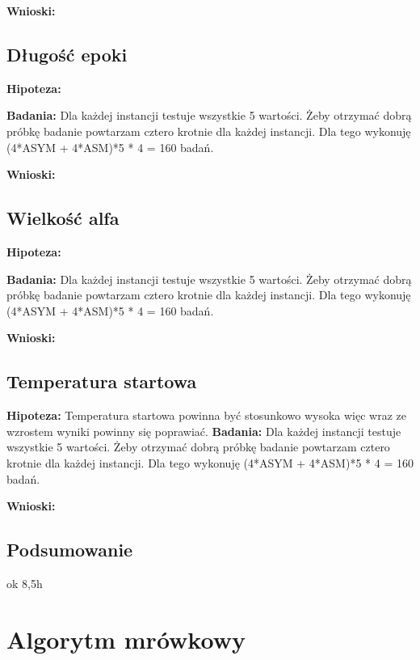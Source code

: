 \documentclass{article}
\begin{document}
        \textbf{Wnioski: } 
      \subsection{Długość epoki}

        \textbf{Hipoteza: }

        \textbf{Badania: } Dla każdej instancji testuje wszystkie 5 wartości. 
        Żeby otrzymać dobrą próbkę badanie powtarzam cztero krotnie dla każdej 
        instancji. Dla tego wykonuję (4*ASYM + 4*ASM)*5 * 4 = 160 badań.\linebreak 

        \textbf{Wnioski: } 
      \subsection{Wielkość alfa}

        \textbf{Hipoteza: }

        \textbf{Badania: } Dla każdej instancji testuje wszystkie 5 wartości. 
        Żeby otrzymać dobrą próbkę badanie powtarzam cztero krotnie dla każdej 
        instancji. Dla tego wykonuję (4*ASYM + 4*ASM)*5 * 4 = 160 badań.\linebreak

        \textbf{Wnioski: } 
      \subsection{Temperatura startowa}

        \textbf{Hipoteza: } Temperatura startowa powinna być stosunkowo wysoka
        więc wraz ze wzrostem wyniki powinny się poprawiać.\linebreak
        \textbf{Badania: } Dla każdej instancji testuje wszystkie 5 wartości. 
        Żeby otrzymać dobrą próbkę badanie powtarzam cztero krotnie dla każdej 
        instancji. Dla tego wykonuję (4*ASYM + 4*ASM)*5 * 4 = 160 badań.\linebreak
        
        \textbf{Wnioski: } 
      \subsection{Podsumowanie}ok 8,5h

    \section{Algorytm mrówkowy}
\end{document}
